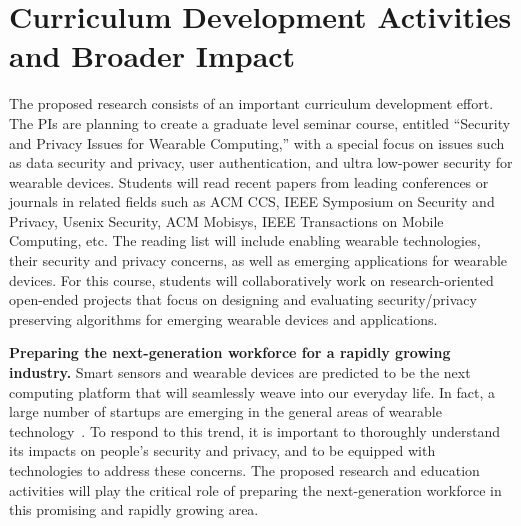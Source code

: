 \section{Curriculum Development Activities and Broader Impact}\label{sec:education}\vspace{-6pt}

The proposed research consists of an important curriculum development effort. The PIs are planning to create a graduate level seminar course, entitled ``Security and Privacy Issues for Wearable Computing,'' with a special focus on issues such as data security and privacy, user authentication, and ultra low-power security for wearable devices. Students will read recent papers from leading conferences or journals in related fields such as ACM CCS, IEEE Symposium on Security and Privacy, Usenix Security, ACM Mobisys, IEEE Transactions on Mobile Computing, etc. The reading list will include enabling wearable technologies, their security and privacy concerns, as well as emerging applications for wearable devices. For this course, students will collaboratively work on research-oriented open-ended projects that focus on designing and evaluating security/privacy preserving algorithms for emerging wearable devices and applications.



\vspace{6pt}\noindent\textbf{Preparing the next-generation workforce for a rapidly growing industry.} Smart sensors and wearable devices are predicted to be the next computing platform that will seamlessly weave into our everyday life. In fact, a large number of startups are emerging in the general areas of wearable technology~\cite{nymi,scheirer1999expression,di2005magic,choudhury2002sociometer,meyerhoff1993line,starner2000gesture,farringdon1999wearable,led2004design,hung2004wearable,mistry2009sixthsense,giansanti2008assessment}. To respond to this trend, it is important to thoroughly understand its impacts on people's security and privacy, and to be equipped with technologies to address these concerns. The proposed research and education activities will play the critical role of preparing the next-generation workforce in this promising and rapidly growing area.

